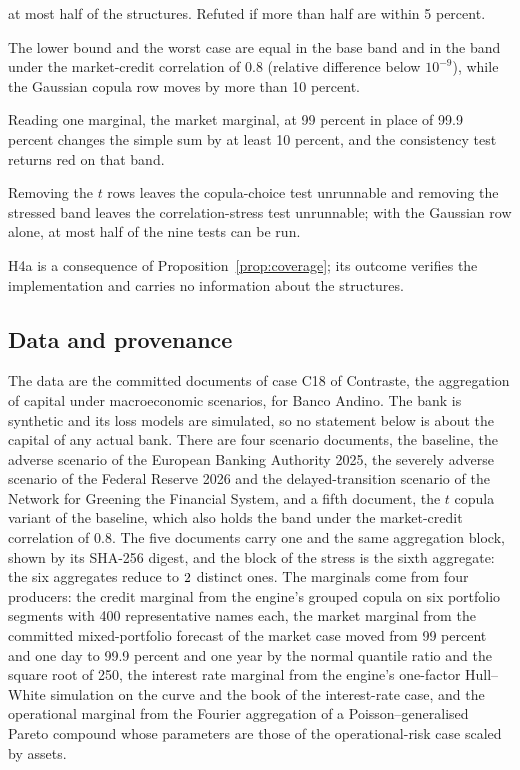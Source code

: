 \begin{description}
at most half of the structures. Refuted if more than half are within 5 percent.
\item[H5, invariance of the bounds.] The lower bound and the worst case are equal in the base band and in the band under the
market-credit correlation of 0.8 (relative difference below $10^{-9}$), while the Gaussian copula row moves by more than 10
percent.
\item[H6, the common horizon and level matter.] Reading one marginal, the market marginal, at 99 percent in place of 99.9 percent
changes the simple sum by at least 10 percent, and the consistency test returns red on that band.
\item[H7, each row feeds a test.] Removing the $t$ rows leaves the copula-choice test unrunnable and removing the stressed band
leaves the correlation-stress test unrunnable; with the Gaussian row alone, at most half of the nine tests can be run.
\end{description}
H4a is a consequence of Proposition~\ref{prop:coverage}; its outcome verifies the implementation and carries no information about
the structures.

\subsection{Data and provenance}
\label{sec:design-data}

The data are the committed documents of case C18 of Contraste, the aggregation of capital under macroeconomic scenarios, for
Banco Andino. The bank is synthetic and its loss models are simulated, so no statement below is about the capital of any
actual bank. There are four scenario documents, the baseline, the adverse scenario of the European Banking Authority 2025, the
severely adverse scenario of the Federal Reserve 2026 and the delayed-transition scenario of the Network for Greening the
Financial System, and a fifth document, the $t$ copula variant of the baseline, which also holds the band under the
market-credit correlation of 0.8. The five documents carry one and the same aggregation block, shown by its SHA-256 digest, and
the block of the stress is the sixth aggregate: the six aggregates reduce to $2$ distinct ones. The marginals come from four producers: the credit marginal from the engine's
grouped copula on six portfolio segments with 400 representative names each, the market marginal from the committed mixed-portfolio
forecast of the market case moved from 99 percent and one day to 99.9 percent and one year by the normal quantile ratio and the
square root of 250, the interest rate marginal from the engine's one-factor Hull--White simulation on the curve and the book of
the interest-rate case, and the operational marginal from the Fourier aggregation of a Poisson--generalised Pareto compound
whose parameters are those of the operational-risk case scaled by assets.

